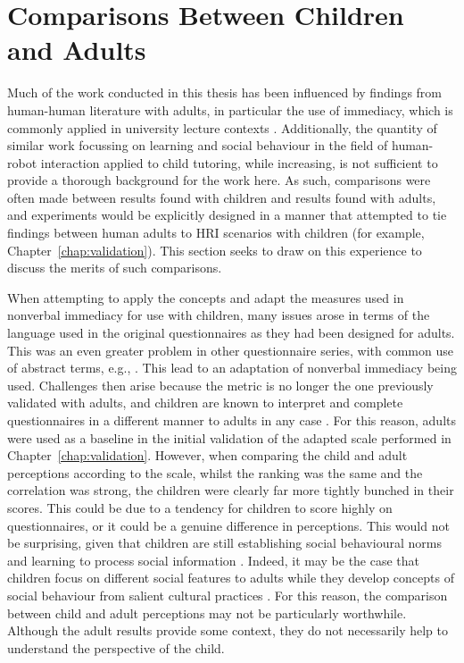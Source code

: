\section{Comparisons Between Children and Adults}
Much of the work conducted in this thesis has been influenced by findings from human-human literature with adults, in particular the use of immediacy, which is commonly applied in university lecture contexts \citep{witt2004meta}. Additionally, the quantity of similar work focussing on learning and social behaviour in the field of human-robot interaction applied to child tutoring, while increasing, is not sufficient to provide a thorough background for the work here. As such, comparisons were often made between results found with children and results found with adults, and experiments would be explicitly designed in a manner that attempted to tie findings between human adults to HRI scenarios with children (for example, Chapter~\ref{chap:validation}). This section seeks to draw on this experience to discuss the merits of such comparisons.

When attempting to apply the concepts and adapt the measures used in nonverbal immediacy for use with children, many issues arose in terms of the language used in the original questionnaires as they had been designed for adults. This was an even greater problem in other questionnaire series, with common use of abstract terms, e.g., \citet{bartneck2009godspeed}. This lead to an adaptation of nonverbal immediacy being used. Challenges then arise because the metric is no longer the one previously validated with adults, and children are known to interpret and complete questionnaires in a different manner to adults in any case \citep{belpaeme2013child,borgers2000children,borgers2004response}. For this reason, adults were used as a baseline in the initial validation of the adapted scale performed in Chapter~\ref{chap:validation}. However, when comparing the child and adult perceptions according to the scale, whilst the ranking was the same and the correlation was strong, the children were clearly far more tightly bunched in their scores. This could be due to a tendency for children to score highly on questionnaires, or it could be a genuine difference in perceptions. This would not be surprising, given that children are still establishing social behavioural norms and learning to process social information \citep{bandura1963social}. Indeed, it may be the case that children focus on different social features to adults while they develop concepts of social behaviour from salient cultural practices \citep{whiting1992children}. For this reason, the comparison between child and adult perceptions may not be particularly worthwhile. Although the adult results provide some context, they do not necessarily help to understand the perspective of the child.

